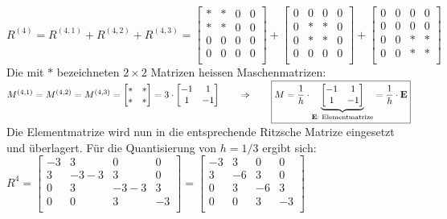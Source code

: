 \qquad $R^{(4)}=R^{(4,1)}+R^{(4,2)}+R^{(4,3)}=
	\begin{bmatrix}
		* & * & 0 & 0 \\
		* & * & 0 & 0 \\
		0 & 0 & 0 & 0 \\
		0 & 0 & 0 & 0 \\
	\end{bmatrix}+
	\begin{bmatrix}
		0 & 0 & 0 & 0 \\
		0 & * & * & 0 \\
		0 & * & * & 0 \\
		0 & 0 & 0 & 0 \\
	\end{bmatrix}+
	\begin{bmatrix}
		0 & 0 & 0 & 0 \\
		0 & 0 & 0 & 0 \\
		0 & 0 & * & * \\
		0 & 0 & * & * \\
	\end{bmatrix}
$\\

Die mit $*$ bezeichneten $2\times 2$ Matrizen heissen Maschenmatrizen:\\

$M^{(4,1)}=M^{(4,2)}=M^{(4,3)}=
	\begin{bmatrix}
		* & * \\
		* & * \\
	\end{bmatrix}=3\cdot\begin{bmatrix}
		-1 & 1  \\
		1  & -1 \\
	\end{bmatrix}\qquad\Rightarrow\qquad\boxed{M=\frac 1h\cdot
		\underset{\text{\textbf{E}: Elementmatrize}}{\underbrace{\begin{bmatrix}
					-1 & 1  \\
					1  & -1 \\
				\end{bmatrix}}}=\frac 1h\cdot \mathbf{E}}$\\

Die Elementmatrize wird nun in die entsprechende Ritzsche Matrize eingesetzt und überlagert. Für die Quantisierung von $h=1/3$ ergibt sich:\\

$R^{4}=
	\begin{bmatrix}
		-3 & 3    & 0    & 0  \\
		3  & -3-3 & 3    & 0  \\
		0  & 3    & -3-3 & 3  \\
		0  & 0    & 3    & -3 \\
	\end{bmatrix}=
	\begin{bmatrix}
		-3 & 3  & 0  & 0  \\
		3  & -6 & 3  & 0  \\
		0  & 3  & -6 & 3  \\
		0  & 0  & 3  & -3 \\
	\end{bmatrix}$\\

